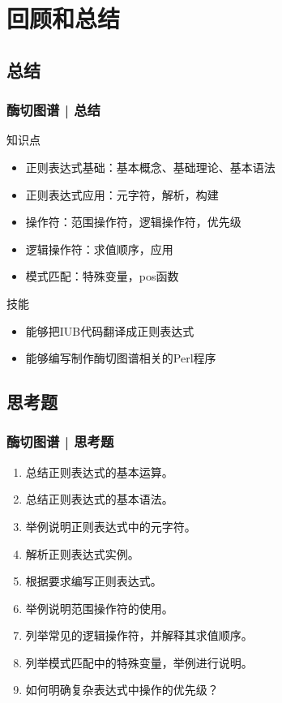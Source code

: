 \section{回顾和总结}
\subsection{总结}
\begin{frame}
  \frametitle{酶切图谱 | 总结}
  \begin{block}{知识点}
    \begin{itemize}
      \item 正则表达式基础：基本概念、基础理论、基本语法
      \item 正则表达式应用：元字符，解析，构建
      \item 操作符：范围操作符，逻辑操作符，优先级
      \item 逻辑操作符：求值顺序，应用
      \item 模式匹配：特殊变量，pos函数
    \end{itemize}
  \end{block}
  \pause
  \begin{block}{技能}
    \begin{itemize}
      \item 能够把IUB代码翻译成正则表达式
      \item 能够编写制作酶切图谱相关的Perl程序
    \end{itemize}
  \end{block}
\end{frame}

\subsection{思考题}
\begin{frame}
  \frametitle{酶切图谱 | 思考题}
  \begin{enumerate}
    \item 总结正则表达式的基本运算。
    \item 总结正则表达式的基本语法。
    \item 举例说明正则表达式中的元字符。
    \item 解析正则表达式实例。
    \item 根据要求编写正则表达式。
    \item 举例说明范围操作符的使用。
    \item 列举常见的逻辑操作符，并解释其求值顺序。
    \item 列举模式匹配中的特殊变量，举例进行说明。
    \item 如何明确复杂表达式中操作的优先级？
  \end{enumerate}
\end{frame}



